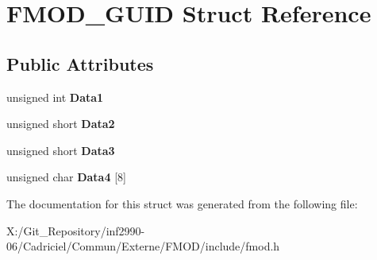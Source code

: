 \hypertarget{struct_f_m_o_d___g_u_i_d}{\section{F\-M\-O\-D\-\_\-\-G\-U\-I\-D Struct Reference}
\label{struct_f_m_o_d___g_u_i_d}
}
\subsection*{Public Attributes}
\begin{DoxyCompactItemize}
\item 
\hypertarget{struct_f_m_o_d___g_u_i_d_ade5cc5a3c9665147a488c8a9e2ea211c}{unsigned int {\bfseries Data1}}\label{struct_f_m_o_d___g_u_i_d_ade5cc5a3c9665147a488c8a9e2ea211c}

\item 
\hypertarget{struct_f_m_o_d___g_u_i_d_ac5805cdbaf5cfa2113d637e11f6ad36e}{unsigned short {\bfseries Data2}}\label{struct_f_m_o_d___g_u_i_d_ac5805cdbaf5cfa2113d637e11f6ad36e}

\item 
\hypertarget{struct_f_m_o_d___g_u_i_d_a98f6f2f06cad235236cbc86099aa4e96}{unsigned short {\bfseries Data3}}\label{struct_f_m_o_d___g_u_i_d_a98f6f2f06cad235236cbc86099aa4e96}

\item 
\hypertarget{struct_f_m_o_d___g_u_i_d_a3a1337ea3f0bec8fbddd197ebdb29cf7}{unsigned char {\bfseries Data4} \mbox{[}8\mbox{]}}\label{struct_f_m_o_d___g_u_i_d_a3a1337ea3f0bec8fbddd197ebdb29cf7}

\end{DoxyCompactItemize}


The documentation for this struct was generated from the following file\-:\begin{DoxyCompactItemize}
\item 
X\-:/\-Git\-\_\-\-Repository/inf2990-\/06/\-Cadriciel/\-Commun/\-Externe/\-F\-M\-O\-D/include/fmod.\-h\end{DoxyCompactItemize}
